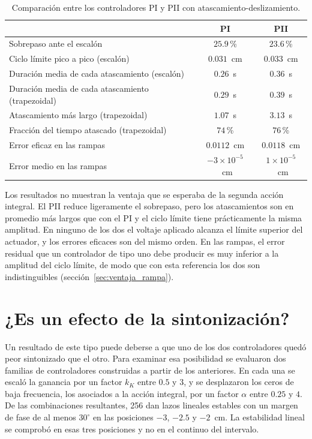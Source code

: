 \begin{table}[ht]
\centering
\caption{Comparación entre los controladores PI y PII con atascamiento-deslizamiento.}
\label{tab:pi_pii}
\begin{tabular}{|l|c|c|}
\hline
 & PI & PII \\ \hline
Sobrepaso ante el escalón & $25.9$\,\% & $23.6$\,\% \\ \hline
Ciclo límite pico a pico (escalón) & $0.031$~cm & $0.033$~cm \\ \hline
Duración media de cada atascamiento (escalón) & $0.26$~s & $0.36$~s \\ \hline
Duración media de cada atascamiento (trapezoidal) & $0.29$~s & $0.39$~s \\ \hline
Atascamiento más largo (trapezoidal) & $1.07$~s & $3.13$~s \\ \hline
Fracción del tiempo atascado (trapezoidal) & $74$\,\% & $76$\,\% \\ \hline
Error eficaz en las rampas & $0.0112$~cm & $0.0118$~cm \\ \hline
Error medio en las rampas & $-3\times10^{-5}$~cm & $1\times10^{-5}$~cm \\ \hline
\end{tabular}
\end{table}

Los resultados no muestran la ventaja que se esperaba de la segunda acción integral. El PII reduce ligeramente el sobrepaso, pero los atascamientos son en promedio más largos que con el PI y el ciclo límite tiene prácticamente la misma amplitud. En ninguno de los dos el voltaje aplicado alcanza el límite superior del actuador, y los errores eficaces son del mismo orden. En las rampas, el error residual que un controlador de tipo uno debe producir es muy inferior a la amplitud del ciclo límite, de modo que con esta referencia los dos son indistinguibles (sección~\ref{sec:ventaja_rampa}).

\section{¿Es un efecto de la sintonización?}\label{sec:barrido_familias}

Un resultado de este tipo puede deberse a que uno de los dos controladores quedó peor sintonizado que el otro. Para examinar esa posibilidad se evaluaron dos familias de controladores construidas a partir de los anteriores. En cada una se escaló la ganancia por un factor $k_K$ entre $0.5$ y $3$, y se desplazaron los ceros de baja frecuencia, los asociados a la acción integral, por un factor $\alpha$ entre $0.25$ y $4$. De las combinaciones resultantes, 256 dan lazos lineales estables con un margen de fase de al menos $30^\circ$ en las posiciones $-3$, $-2.5$ y $-2$~cm. La estabilidad lineal se comprobó en esas tres posiciones y no en el continuo del intervalo.

